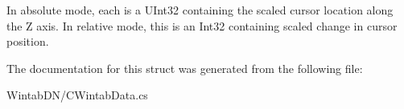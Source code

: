In absolute mode, each is a UInt32 containing the scaled cursor location along the Z axis. In relative mode, this is an Int32 containing scaled change in cursor position. 



The documentation for this struct was generated from the following file:\begin{DoxyCompactItemize}
\item 
WintabDN/CWintabData.cs\end{DoxyCompactItemize}
